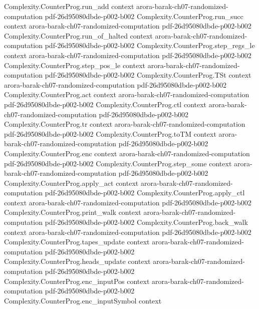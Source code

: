 \begin{theorem}
\proofstep
  {Complexity.CounterProg.run_add}
  {context}
  {arora-barak-ch07-randomized-computation}
  {pdf-26d95080dbde-p002-b002}
\proofstep
  {Complexity.CounterProg.run_succ}
  {context}
  {arora-barak-ch07-randomized-computation}
  {pdf-26d95080dbde-p002-b002}
\proofstep
  {Complexity.CounterProg.run_of_halted}
  {context}
  {arora-barak-ch07-randomized-computation}
  {pdf-26d95080dbde-p002-b002}
\proofstep
  {Complexity.CounterProg.step_regs_le}
  {context}
  {arora-barak-ch07-randomized-computation}
  {pdf-26d95080dbde-p002-b002}
\proofstep
  {Complexity.CounterProg.step_pos_le}
  {context}
  {arora-barak-ch07-randomized-computation}
  {pdf-26d95080dbde-p002-b002}
\proofstep
  {Complexity.CounterProg.TSt}
  {context}
  {arora-barak-ch07-randomized-computation}
  {pdf-26d95080dbde-p002-b002}
\proofstep
  {Complexity.CounterProg.act}
  {context}
  {arora-barak-ch07-randomized-computation}
  {pdf-26d95080dbde-p002-b002}
\proofstep
  {Complexity.CounterProg.ctl}
  {context}
  {arora-barak-ch07-randomized-computation}
  {pdf-26d95080dbde-p002-b002}
\proofstep
  {Complexity.CounterProg.tr}
  {context}
  {arora-barak-ch07-randomized-computation}
  {pdf-26d95080dbde-p002-b002}
\proofstep
  {Complexity.CounterProg.toTM}
  {context}
  {arora-barak-ch07-randomized-computation}
  {pdf-26d95080dbde-p002-b002}
\proofstep
  {Complexity.CounterProg.enc}
  {context}
  {arora-barak-ch07-randomized-computation}
  {pdf-26d95080dbde-p002-b002}
\proofstep
  {Complexity.CounterProg.step_some}
  {context}
  {arora-barak-ch07-randomized-computation}
  {pdf-26d95080dbde-p002-b002}
\proofstep
  {Complexity.CounterProg.apply_act}
  {context}
  {arora-barak-ch07-randomized-computation}
  {pdf-26d95080dbde-p002-b002}
\proofstep
  {Complexity.CounterProg.apply_ctl}
  {context}
  {arora-barak-ch07-randomized-computation}
  {pdf-26d95080dbde-p002-b002}
\proofstep
  {Complexity.CounterProg.print_walk}
  {context}
  {arora-barak-ch07-randomized-computation}
  {pdf-26d95080dbde-p002-b002}
\proofstep
  {Complexity.CounterProg.back_walk}
  {context}
  {arora-barak-ch07-randomized-computation}
  {pdf-26d95080dbde-p002-b002}
\proofstep
  {Complexity.CounterProg.tapes_update}
  {context}
  {arora-barak-ch07-randomized-computation}
  {pdf-26d95080dbde-p002-b002}
\proofstep
  {Complexity.CounterProg.heads_update}
  {context}
  {arora-barak-ch07-randomized-computation}
  {pdf-26d95080dbde-p002-b002}
\proofstep
  {Complexity.CounterProg.enc_inputPos}
  {context}
  {arora-barak-ch07-randomized-computation}
  {pdf-26d95080dbde-p002-b002}
\proofstep
  {Complexity.CounterProg.enc_inputSymbol}
  {context}

\end{theorem}

